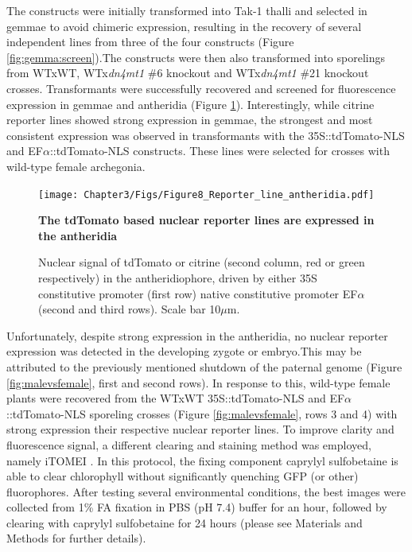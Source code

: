 The constructs were initially transformed into Tak-1 thalli and selected in gemmae to avoid chimeric expression, resulting in the recovery of several independent lines from three of the four constructs (Figure \ref{fig:gemma:screen}).The constructs were then also transformed into sporelings from WTxWT, WTx\textit{dn4mt1} \#6 knockout and WTx\textit{dn4mt1} \#21 knockout crosses. Transformants were successfully recovered and screened for fluorescence expression in gemmae and antheridia (Figure \ref{fig:antheridia_screen}). Interestingly, while citrine reporter lines showed strong expression in gemmae, the strongest and most consistent expression was observed in transformants with the 35S::tdTomato-NLS and EF$\alpha$::tdTomato-NLS constructs. These lines were selected for crosses with wild-type female archegonia.

\begin{figure}[htbp!] 
\centering    
    \texttt{[image: Chapter3/Figs/Figure8\_Reporter\_line\_antheridia.pdf]}
\caption{\textbf{The tdTomato based nuclear reporter lines are expressed in the antheridia}}
\label{fig:antheridia_screen}
\captionsetup{font=small}
    \caption*{Nuclear signal of tdTomato or citrine (second column, red or green respectively) in the antheridiophore, driven by either 35S constitutive promoter (first row) native constitutive promoter EF$\alpha$ (second and third rows). Scale bar 10$\mu$m.}
\end{figure}

Unfortunately, despite strong expression in the antheridia, no nuclear reporter expression was detected in the developing zygote or embryo.This may be attributed to the previously mentioned shutdown of the paternal genome (Figure \ref{fig:malevsfemale}, first and second rows).  In response to this, wild-type female plants were recovered from the WTxWT 35S::tdTomato-NLS and  EF$\alpha$::tdTomato-NLS sporeling crosses (Figure \ref{fig:malevsfemale}, rows 3 and 4) with strong expression their respective nuclear reporter lines. To improve clarity and fluorescence signal, a different clearing and staining method was employed, namely iTOMEI \cite{RN279}. In this protocol, the fixing component caprylyl sulfobetaine is able to clear chlorophyll without significantly quenching GFP (or other) fluorophores. After testing several environmental conditions, the best images were collected from 1\% FA fixation in PBS (pH 7.4) buffer for an hour, followed by clearing with caprylyl sulfobetaine for 24 hours (please see Materials and Methods for further details).


